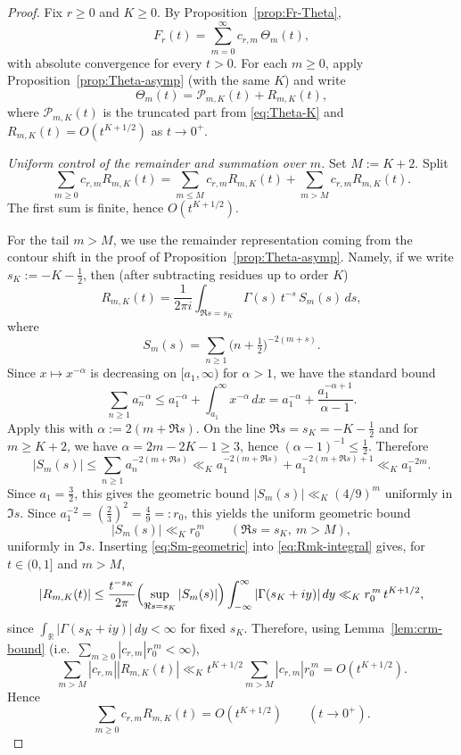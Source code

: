 \documentclass[11pt,letterpaper]{amsart}
\numberwithin{equation}{section}
\theoremstyle{definition}
\newcommand{\R}{\mathbb{R}}
\begin{document}
\begin{proof}
Fix $r\ge 0$ and $K\ge 0$. By Proposition~\ref{prop:Fr-Theta},
\[
F_r(t)=\sum_{m=0}^\infty c_{r,m}\,\Theta_m(t),
\]
with absolute convergence for every $t>0$. For each $m\ge0$, apply
Proposition~\ref{prop:Theta-asymp} (with the same $K$) and write
\[
\Theta_m(t)=\mathcal{P}_{m,K}(t)+R_{m,K}(t),
\]
where $\mathcal{P}_{m,K}(t)$ is the truncated part from \eqref{eq:Theta-K} and
$R_{m,K}(t)=O(t^{K+1/2})$ as $t\to0^+$.

\medskip
\noindent\emph{Uniform control of the remainder and summation over $m$.}
Set $M:=K+2$. Split
\[
\sum_{m\ge0}c_{r,m}R_{m,K}(t)=\sum_{m\le M}c_{r,m}R_{m,K}(t)+\sum_{m>M}c_{r,m}R_{m,K}(t).
\]
The first sum is finite, hence $O(t^{K+1/2})$.

For the tail $m>M$, we use the remainder representation coming from the contour shift
in the proof of Proposition~\ref{prop:Theta-asymp}. Namely, if we write
$s_K:=-K-\tfrac12$, then (after subtracting residues up to order $K$)
\begin{equation}\label{eq:Rmk-integral}
R_{m,K}(t)=\frac{1}{2\pi i}\int_{\Re s=s_K}\Gamma(s)\,t^{-s}\,S_m(s)\,ds,
\end{equation}
where
\[
S_m(s)=\sum_{n\ge1}\bigl(n+\tfrac12\bigr)^{-2(m+s)}.
\]
Since $x\mapsto x^{-\alpha}$ is decreasing on $[a_1,\infty)$ for $\alpha>1$, we have the standard bound
\[
\sum_{n\ge1} a_n^{-\alpha}
\le a_1^{-\alpha}+\int_{a_1}^{\infty}x^{-\alpha}\,dx
= a_1^{-\alpha}+\frac{a_1^{-\alpha+1}}{\alpha-1}.
\]
Apply this with $\alpha:=2(m+\Re s)$. On the line $\Re s=s_K=-K-\tfrac12$ and for $m\ge K+2$,
we have $\alpha=2m-2K-1\ge3$, hence $(\alpha-1)^{-1}\le \tfrac12$. Therefore
\[
|S_m(s)|
\le \sum_{n\ge1}a_n^{-2(m+\Re s)}
\ll_K a_1^{-2(m+\Re s)}+a_1^{-2(m+\Re s)+1}
\ll_K a_1^{-2m}.
\]
Since $a_1=\tfrac32$, this gives the geometric bound $|S_m(s)|\ll_K (4/9)^m$ uniformly in $\Im s$. Since $a_1^{-2}=(\tfrac23)^2=\tfrac49=:r_0$, this yields the uniform geometric bound
\begin{equation}\label{eq:Sm-geometric}
|S_m(s)|\ll_{K} r_0^{\,m}\qquad(\Re s=s_K,\ m>M),
\end{equation}
uniformly in $\Im s$. Inserting \eqref{eq:Sm-geometric} into \eqref{eq:Rmk-integral} gives, for
$t\in(0,1]$ and $m>M$,
\[
|R_{m,K}(t)|
\le \frac{t^{-s_K}}{2\pi}\Bigl(\sup_{\Re s=s_K}|S_m(s)|\Bigr)\int_{-\infty}^{\infty}|\Gamma(s_K+iy)|\,dy
\ll_{K} r_0^{\,m}\,t^{K+1/2},
\]
since $\int_{\R}|\Gamma(s_K+iy)|\,dy<\infty$ for fixed $s_K$.
Therefore, using Lemma~\ref{lem:crm-bound} (i.e.\ $\sum_{m\ge0}|c_{r,m}|r_0^{\,m}<\infty$),
\[
\sum_{m>M}|c_{r,m}||R_{m,K}(t)| \ll_K t^{K+1/2}\sum_{m>M}|c_{r,m}|r_0^{\,m}
=O(t^{K+1/2}).
\]
Hence
\[
\sum_{m\ge0}c_{r,m}R_{m,K}(t)=O(t^{K+1/2})\qquad(t\to0^+).
\]


\end{proof}
\end{document}

